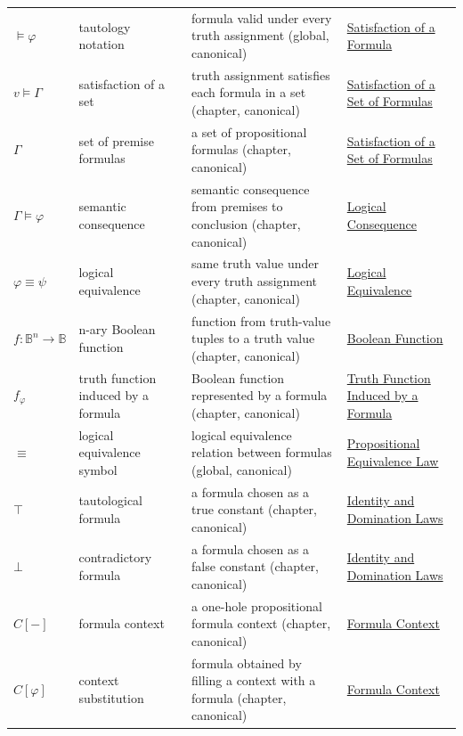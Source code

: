 \begin{longtable}{p{}p{}p{}p{}}
\(\models\varphi\) & tautology notation & formula valid under every truth assignment (global, canonical) & \hyperref[def:satisfaction-propositional-formula]{Satisfaction of a Formula}\\
\(v\models\Gamma\) & satisfaction of a set & truth assignment satisfies each formula in a set (chapter, canonical) & \hyperref[def:satisfaction-set-propositional-logic]{Satisfaction of a Set of Formulas}\\
\(\Gamma\) & set of premise formulas & a set of propositional formulas (chapter, canonical) & \hyperref[def:satisfaction-set-propositional-logic]{Satisfaction of a Set of Formulas}\\
\(\Gamma\models\varphi\) & semantic consequence & semantic consequence from premises to conclusion (chapter, canonical) & \hyperref[def:logical-consequence-propositional-logic]{Logical Consequence}\\
\(\varphi\equiv\psi\) & logical equivalence & same truth value under every truth assignment (chapter, canonical) & \hyperref[def:logical-equivalence-propositional-logic]{Logical Equivalence}\\
\(f:\mathbb{B}^n\to\mathbb{B}\) & n-ary Boolean function & function from truth-value tuples to a truth value (chapter, canonical) & \hyperref[def:boolean-function-propositional-logic]{Boolean Function}\\
\(f_\varphi\) & truth function induced by a formula & Boolean function represented by a formula (chapter, canonical) & \hyperref[def:truth-function-induced-by-formula]{Truth Function Induced by a Formula}\\
\(\equiv\) & logical equivalence symbol & logical equivalence relation between formulas (global, canonical) & \hyperref[def:propositional-equivalence-law]{Propositional Equivalence Law}\\
\(\top\) & tautological formula & a formula chosen as a true constant (chapter, canonical) & \hyperref[thm:identity-domination-laws-propositional-logic]{Identity and Domination Laws}\\
\(\bot\) & contradictory formula & a formula chosen as a false constant (chapter, canonical) & \hyperref[thm:identity-domination-laws-propositional-logic]{Identity and Domination Laws}\\
\(C[-]\) & formula context & a one-hole propositional formula context (chapter, canonical) & \hyperref[def:formula-context-propositional-logic]{Formula Context}\\
\(C[\varphi]\) & context substitution & formula obtained by filling a context with a formula (chapter, canonical) & \hyperref[def:formula-context-propositional-logic]{Formula Context}\\
\end{longtable}
